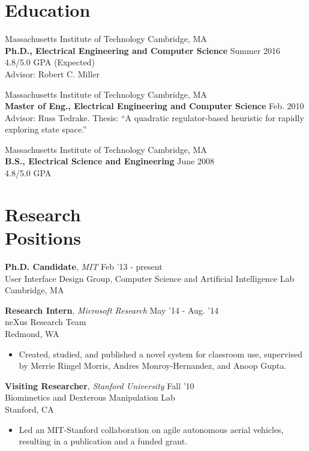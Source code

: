 \documentclass[margin]{res}
\begin{document}
\begin{resume}

\section{Education} 
Massachusetts Institute of Technology \hfill Cambridge, MA \\
{\bf Ph.D., Electrical Engineering and Computer Science} \hfill Summer 2016\\
4.8/5.0 GPA  \hfill (Expected) \\
Advisor: Robert C. Miller 


Massachusetts Institute of Technology \hfill Cambridge, MA \\
{\bf Master of Eng., Electrical Engineering and Computer Science} \hfill Feb. 2010 \\
Advisor: Russ Tedrake. Thesis: ``A quadratic regulator-based heuristic for rapidly exploring state space.''

Massachusetts Institute of Technology \hfill Cambridge, MA \\
{\bf B.S., Electrical Science and Engineering} \hfill June 2008 \\
4.8/5.0 GPA

\section{Research \\Positions}

 {\bf Ph.D. Candidate}, {\it MIT} \hfill Feb '13 - present \\ User Interface Design Group, Computer Science and Artificial Intelligence Lab \\ Cambridge, MA 


{\bf Research Intern}, {\it Microsoft Research} \hfill May '14 - Aug. '14 \\ neXus Research Team \\ Redmond, WA 
 \begin{itemize} \itemsep -2pt  %
 \item Created, studied, and published a novel system for classroom use, supervised by Merrie Ringel Morris, Andres Monroy-Hernandez, and Anoop Gupta. 
\end{itemize}

 {\bf Visiting Researcher}, {\it Stanford University} \hfill Fall '10 \\Biomimetics and Dexterous Manipulation Lab  \\ Stanford, CA 
 \begin{itemize} \itemsep -2pt  %
\item Led an MIT-Stanford collaboration on agile autonomous aerial vehicles, resulting in a publication and a funded grant.
 \end{itemize}


\end{resume}
\end{document}

